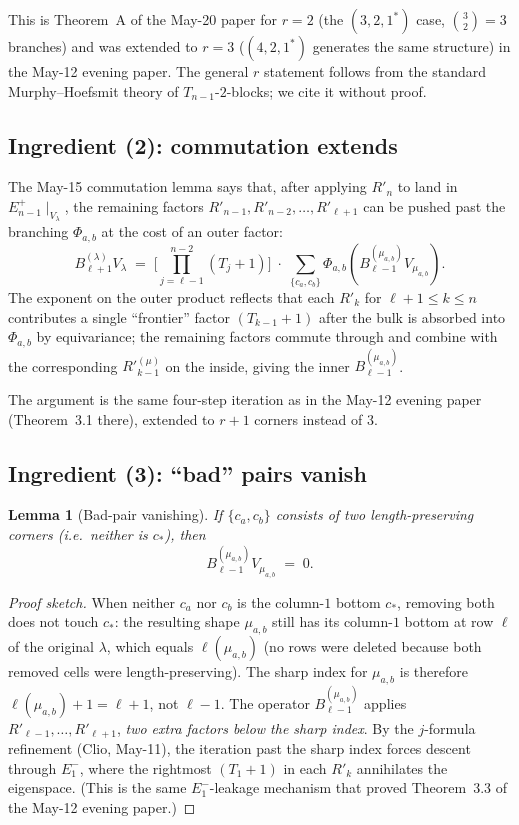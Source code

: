 \documentclass[11pt]{article}
\newtheorem{lemma}[theorem]{Lemma}
\theoremstyle{definition}
\begin{document}
This is Theorem~A of the May-20 paper for $r = 2$ (the $(3, 2, 1^*)$
case, $\binom{3}{2} = 3$ branches) and was extended to $r = 3$
($(4, 2, 1^*)$ generates the same structure) in the May-12 evening
paper. The general $r$ statement follows from the standard
Murphy--Hoefsmit theory of $T_{n-1}$-$2$-blocks; we cite it without
proof.

\subsection{Ingredient (2): commutation extends}

The May-15 commutation lemma says that, after applying $R'_n$ to land
in $E_{n-1}^+\!\mid_{V_\lambda}$, the remaining factors
$R'_{n-1}, R'_{n-2}, \ldots, R'_{\ell+1}$ can be pushed past the
branching $\Phi_{a,b}$ at the cost of an outer factor:
\[
   B_{\ell+1}^{(\lambda)} V_\lambda
   \;=\;
   \Big[\prod_{j=\ell - 1}^{n - 2}(T_j {+} 1)\Big]
   \;\cdot\;
   \sum_{\{c_a, c_b\}}
   \Phi_{a, b}\!\left(B_{\ell - 1}^{(\mu_{a,b})} V_{\mu_{a,b}}\right).
\]
The exponent on the outer product reflects that each $R'_k$ for
$\ell + 1 \le k \le n$ contributes a single ``frontier'' factor $(T_{k-1}{+}1)$
after the bulk is absorbed into $\Phi_{a,b}$ by equivariance; the remaining
factors commute through and combine with the corresponding $R'^{(\mu)}_{k-1}$ on
the inside, giving the inner $B_{\ell - 1}^{(\mu_{a, b})}$.

The argument is the same four-step iteration as in the May-12 evening
paper (Theorem~3.1 there), extended to $r + 1$ corners instead of $3$.

\subsection{Ingredient (3): ``bad'' pairs vanish}

\begin{lemma}[Bad-pair vanishing]\label{lem:bad-vanish}
If $\{c_a, c_b\}$ consists of two length-preserving corners (i.e.\
neither is $c_*$), then
\[
   B_{\ell - 1}^{(\mu_{a, b})} V_{\mu_{a, b}} \;=\; 0.
\]
\end{lemma}

\begin{proof}[Proof sketch]
When neither $c_a$ nor $c_b$ is the column-$1$ bottom $c_*$, removing
both does not touch $c_*$: the resulting shape $\mu_{a,b}$ still has its
column-$1$ bottom at row $\ell$ of the original $\lambda$, which equals
$\ell(\mu_{a, b})$ (no rows were deleted because both removed cells were
length-preserving). The sharp index for $\mu_{a, b}$ is therefore
$\ell(\mu_{a, b}) + 1 = \ell + 1$, not $\ell - 1$. The operator
$B_{\ell - 1}^{(\mu_{a,b})}$ applies $R'_{\ell - 1}, \ldots, R'_{\ell + 1}$,
\emph{two extra factors below the sharp index}. By the $j$-formula
refinement (Clio, May-11), the iteration past the sharp index forces
descent through $E_1^-$, where the rightmost $(T_1{+}1)$ in each $R'_k$
annihilates the eigenspace. (This is the same $E_1^-$-leakage mechanism
that proved Theorem~3.3 of the May-12 evening paper.)
\end{proof}
\end{document}
